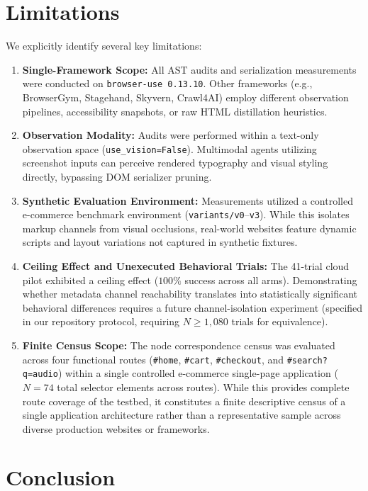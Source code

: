 \documentclass[11pt,a4paper]{article}
\begin{document}
\section{Limitations}
\label{sec:limitations}

We explicitly identify several key limitations:
\begin{enumerate}
    \item \textbf{Single-Framework Scope:} All AST audits and serialization measurements were conducted on \texttt{browser-use 0.13.10}. Other frameworks (e.g., BrowserGym, Stagehand, Skyvern, Crawl4AI) employ different observation pipelines, accessibility snapshots, or raw HTML distillation heuristics.
    \item \textbf{Observation Modality:} Audits were performed within a text-only observation space (\texttt{use\_vision=False}). Multimodal agents utilizing screenshot inputs can perceive rendered typography and visual styling directly, bypassing DOM serializer pruning.
    \item \textbf{Synthetic Evaluation Environment:} Measurements utilized a controlled e-commerce benchmark environment (\texttt{variants/v0}--\texttt{v3}). While this isolates markup channels from visual occlusions, real-world websites feature dynamic scripts and layout variations not captured in synthetic fixtures.
    \item \textbf{Ceiling Effect and Unexecuted Behavioral Trials:} The 41-trial cloud pilot exhibited a ceiling effect ($100\%$ success across all arms). Demonstrating whether metadata channel reachability translates into statistically significant behavioral differences requires a future channel-isolation experiment (specified in our repository protocol, requiring $N \ge 1,080$ trials for equivalence).
    \item \textbf{Finite Census Scope:} The node correspondence census was evaluated across four functional routes (\texttt{\#home}, \texttt{\#cart}, \texttt{\#checkout}, and \texttt{\#search?q=audio}) within a single controlled e-commerce single-page application ($N=74$ total selector elements across routes). While this provides complete route coverage of the testbed, it constitutes a finite descriptive census of a single application architecture rather than a representative sample across diverse production websites or frameworks.
\end{enumerate}

\section{Conclusion}
\label{sec:conclusion}
\end{document}
